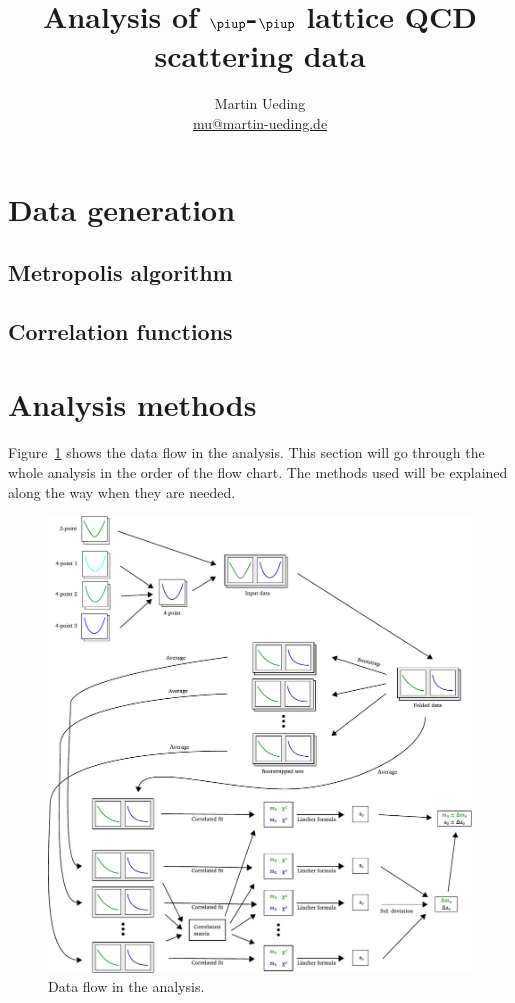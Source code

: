 \documentclass[11pt, english, fleqn, DIV=15, headinclude]{scrartcl}
\title{Analysis of $\piup$-$\piup$ lattice QCD scattering data}
\author{
    Martin Ueding \\ \small{\href{mailto:mu@martin-ueding.de}{mu@martin-ueding.de}}
}
\begin{document}
\maketitle

\begin{abstract}
\end{abstract}

\tableofcontents

\newpage

\section{Data generation}

\subsection{Metropolis algorithm}

\subsection{Correlation functions}

\section{Analysis methods}

Figure~\ref{fig:analysis-flow} shows the data flow in the analysis. This
section will go through the whole analysis in the order of the flow chart. The
methods used will be explained along the way when they are needed.

\begin{figure}[htbp]
    \centering
    \includegraphics[width=\linewidth]{sketches/Zeichnung.pdf}
    \caption{%
        Data flow in the analysis.
    }
    \label{fig:analysis-flow}
\end{figure}
\end{document}
